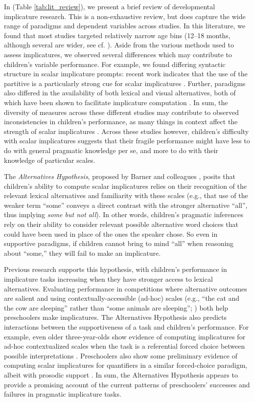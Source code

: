 \documentclass[man]{apa2}
\begin{document}
In (Table \ref{tab:lit_review}), we present a brief review of developmental implicature research. This is a non-exhaustive review, but does capture the wide range of paradigms and dependent variables across studies. In this literature, we found that most studies targeted relatively narrow age bins (12--18 months, although several are wider, see cf. ). Aside from the various methods used to assess implicatures, we observed several differences which may contribute to children's variable performance. For example, we found differing syntactic structure in scalar implicature prompts: recent work indicates that the use of the partitive is a particularly strong cue for scalar implicatures \cite{degen2014}. Further, paradigms also differed in the availability of both lexical and visual alternatives, both of which have been shown to facilitate implicature computation \cite{stiller2014}. In sum, the diversity of measures across these different studies may contribute to observed inconsistencies in children's performance, as many things in context affect the strength of scalar implicatures \cite{degen2015}. Across these studies however, children's difficulty with scalar implicatures suggests that their fragile performance might have less to do with general pragmatic knowledge per se, and more to do with their knowledge of particular scales. 

The \emph{Alternatives Hypothesis}, proposed by Barner and colleagues \cite{barner2010, barner2011}, posits that children's ability to compute scalar implicatures relies on their recognition of the relevant lexical alternatives and familiarity with these scales (e.g., that use of the weaker term ``some'' conveys a direct contrast with the stronger alternative ``all'', thus implying \emph{some but not all}). In other words, children's pragmatic inferences rely on their ability to consider relevant possible alternative word choices that could have been used in place of the ones the speaker chose. So even in supportive paradigms, if children cannot bring to mind ``all'' when reasoning about ``some,'' they will fail to make an implicature.

Previous research supports this hypothesis, with children's performance in implicature tasks increasing when they have stronger access to lexical alternatives. Evaluating performance in competitions where alternative outcomes are salient \cite{papafragou2003} and using contextually-accessible (ad-hoc) scales (e.g., ``the cat and the cow are sleeping'' rather than ``some animals are sleeping''; ) both help preschoolers make implicatures. The Alternatives Hypothesis also predicts interactions between the supportiveness of a task and children's performance. For example, even older three-year-olds show evidence of computing implicatures for ad-hoc contextualized scales when the task is a referential forced choice between possible interpretations \cite{stiller2014}. Preschoolers also show some preliminary evidence of computing scalar implicatures for quantifiers in a similar forced-choice paradigm, albeit with prosodic support \cite{miller2005}. In sum, the Alternatives Hypothesis appears to provide a promising account of the current patterns of preschoolers' successes and failures in pragmatic implicature tasks.
\end{document}
